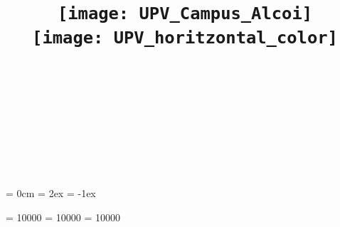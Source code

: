 
\usepackage[
	url = false,
	style = apa,
	hyperref = true,
	backref = true,
	]{biblatex}

\usepackage{csquotes}


\graphicspath{
    {./figuras/}
    {./logos/}
    }


\usepackage{xifthen}


\ifundef{\AlumnoB}{\newcommand{\AlumnoB}{}}{}
\ifundef{\AlumnoC}{\newcommand{\AlumnoC}{}}{}

\title{\Huge\bfseries%
	\vspace*{-1cm}
    \ifLogoAlcoi
	   \texttt{[image: UPV\_Campus\_Alcoi]}\\
    \else
        \texttt{[image: UPV\_horitzontal\_color]}\\
    \fi
    \vspace*{5cm}
    \titol
    \vspace*{3.5cm}
    ~
    }
    
\author{
    \AlumnoA\\[1ex]
    \AlumnoB\\[1ex]
	\AlumnoC\\[3.5cm]
  	\textbf{\Asignatura}\\[2ex]
  	\textbf{\CursoTitulacion}
    }
    
\date{\Data}


\parindent = 0cm
\parskip = 2ex
\partopsep = -1ex


\clubpenalty = 10000
\widowpenalty = 10000
\displaywidowpenalty = 10000


\usepackage{xspace}

\newcommand{\matlab}{{\textsc{Matlab}}\xspace}
\newcommand{\simulink}{\textit{Simulink}\xspace}



